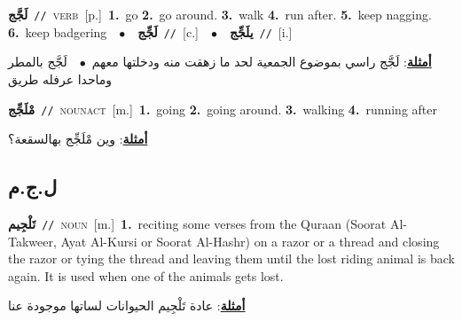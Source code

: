 \documentclass[10pt,a4paper,twoside]{article} %
\begin{document}
\begin{multicols}{2}
{\setlength\topsep{0pt}\textbf{\foreignlanguage{arabic}{لَجَّج}}\ {\color{gray}\texttt{//}\color{black}}\ \textsc{verb}\ [p.]\ \textbf{1.}~go  \textbf{2.}~go around.  \textbf{3.}~walk  \textbf{4.}~run after.  \textbf{5.}~keep nagging.  \textbf{6.}~keep badgering\ \ $\bullet$\ \ \setlength\topsep{0pt}\textbf{\foreignlanguage{arabic}{لَجِّج}}\ {\color{gray}\texttt{//}\color{black}}\ [c.]\ \ $\bullet$\ \ \setlength\topsep{0pt}\textbf{\foreignlanguage{arabic}{يلَجِّج}}\ {\color{gray}\texttt{//}\color{black}}\ [i.]\  \begin{flushright}\color{gray}\foreignlanguage{arabic}{\textbf{\underline{\foreignlanguage{arabic}{أمثلة}}}: لَجَّج راسي بموضوع الجمعية لحد ما زهقت منه ودخلتها معهم\ $\bullet$\ \  لَجَّج بالمطر وماحدا عرفله طريق}\end{flushright}\color{black}} \vspace{2mm}

{\setlength\topsep{0pt}\textbf{\foreignlanguage{arabic}{مْلَجِّج}}\ {\color{gray}\texttt{//}\color{black}}\ \textsc{noun\textunderscore act}\ [m.]\ \textbf{1.}~going  \textbf{2.}~going around.  \textbf{3.}~walking  \textbf{4.}~running after\  \begin{flushright}\color{gray}\foreignlanguage{arabic}{\textbf{\underline{\foreignlanguage{arabic}{أمثلة}}}: وين مْلَجِّج بهالسقعة؟}\end{flushright}\color{black}} \vspace{2mm}

\vspace{-3mm}
\subsection*{\color{blue}\foreignlanguage{arabic}{ل.ج.م}\color{blue}{}} 

{\setlength\topsep{0pt}\textbf{\foreignlanguage{arabic}{تَلْجِيم}}\ {\color{gray}\texttt{//}\color{black}}\ \textsc{noun}\ [m.]\ \textbf{1.}~reciting some verses from the Quraan (Soorat Al-Takweer, Ayat Al-Kursi or Soorat Al-Hashr) on a razor or a thread and closing the razor or tying the thread and leaving them until the lost riding animal is back again. It is used when one of the animals gets lost.\  \begin{flushright}\color{gray}\foreignlanguage{arabic}{\textbf{\underline{\foreignlanguage{arabic}{أمثلة}}}: عادة تَلْجِيم الحيوانات لساتها موجودة عنا}\end{flushright}\color{black}} \vspace{2mm}


\end{multicols}
\end{document}
